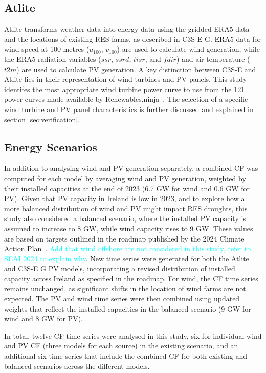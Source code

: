 \documentclass[a4paper, 11p1t]{article}
\begin{document}
\subsection{Atlite} 
\label{sec:atlite}

Atlite transforms weather data into energy data using the gridded ERA5 data and the locations of existing RES farms, as described in C3S-E G. ERA5 data for wind speed at 100 metres ($u_{100}$, $v_{100}$) are used to calculate wind generation, while the ERA5 radiation variables ($ssr$, $ssrd$, $tisr$, and $fdir$) and air temperature ($t2m$) are used to calculate PV generation. A key distinction between C3S-E and Atlite lies in their representation of wind turbines and PV panels. This study identifes the most appropriate wind turbine power curve to use from the 121 power curves made available by Renewables.ninja~\cite{staffell2016wake}. The selection of a specific wind turbine and PV panel characteristics is further discussed and explained in section \ref{sec:verification}.

\subsection{Energy Scenarios}
\label{sec:scenarios}

In addition to analysing wind and PV generation separately, a combined CF was computed for each model by averaging wind and PV generation, weighted by their installed capacities at the end of 2023 (6.7 GW for wind and 0.6 GW for PV). Given that PV capacity in Ireland is low in 2023, and to explore how a more balanced distribution of wind and PV might impact RES droughts, this study also considered a balanced scenario, where the installed PV capacity is assumed to increase to 8 GW, while wind capacity rises to 9 GW. These values are based on targets outlined in the roadmap published by the 2024 Climate Action Plan~\cite{cap2024future}. \textcolor{cyan}{Add that wind offshore are not considered in this study, refer to SEAI 2024 to explain why}. New time series were generated for both the Atlite and C3S-E G PV models, incorporating a revised distribution of installed capacity across Ireland as specified in the roadmap. For wind, the CF time series remains unchanged, as significant shifts in the location of wind farms are not expected. The PV and wind time series were then combined using updated weights that reflect the installed capacities in the balanced scenario (9 GW for wind and 8 GW for PV).

In total, twelve CF time series were analysed in this study, six for individual wind and PV CF (three models for each source) in the existing scenario, and an additional six time series that include the combined CF for both existing and balanced scenarios across the different models.
\end{document}
